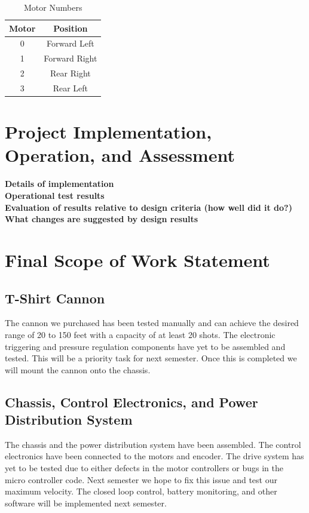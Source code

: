 \documentclass[letterpaper,12pt]{article}
\newcommand{\xxx}[1]{{\color{red}\bf #1}}
\begin{document}
\begin{table}[h!]
  \centering
  \begin{tabular}{| c | c |}
    \hline
    \textbf{Motor} & \textbf{Position} \\
    \hline
    0 & Forward Left \\
    \hline
    1 & Forward Right \\
    \hline
    2 & Rear Right \\
    \hline
    3 & Rear Left \\
    \hline
  \end{tabular}
  \caption{Motor Numbers}
  \label{tab:motor_nums}
\end{table}

\section{Project Implementation, Operation, and Assessment}
\label{sec:implopassess}
\xxx{Details of implementation} \\
\xxx{Operational test results} \\
\xxx{Evaluation of results relative to design criteria (how well did it do?)} \\
\xxx{What changes are suggested by design results}

\section{Final Scope of Work Statement}
\label{sec:finalscope}

\subsection{T-Shirt Cannon}
The cannon we purchased has been tested manually and can achieve the desired
range of 20 to 150 feet with a capacity of at least 20 shots. The electronic
triggering and pressure regulation components have yet to be assembled and
tested. This will be a priority task for next semester. Once this is completed
we will mount the cannon onto the chassis.\\

\subsection{Chassis, Control Electronics, and Power Distribution System}
The chassis and the power distribution system have been assembled. The control
electronics have been connected to the motors and encoder. The drive system has
yet to be tested due to either defects in the motor controllers or bugs in the
micro controller code. Next semester we hope to fix this issue and test our
maximum velocity. The closed loop control, battery monitoring, and other
software will be implemented next semester.\\
\end{document}
